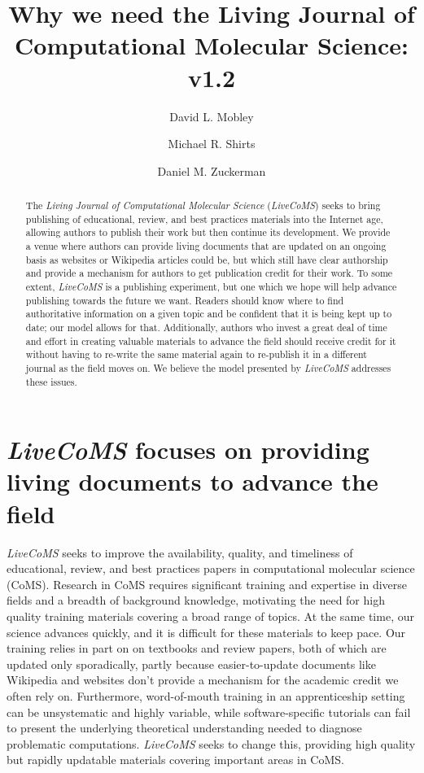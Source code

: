 \documentclass[9pt,editorial]{livecoms}
\title{Why we need the Living Journal of Computational Molecular Science: v1.2}
\author[1*]{David L. Mobley}
\author[2*]{Michael R. Shirts}
\author[3*]{Daniel M. Zuckerman}
\affil[1]{Department of Pharmaceutical Sciences and Chemistry, University of California, Irvine}
\affil[2]{Department of Chemical and Biological Engineering, University of Colorado Boulder}
\affil[3]{Department of Biomedical Engineering, Oregon Health and Science University}
\begin{document}
\begin{frontmatter}

\maketitle

\begin{abstract}
The \emph{Living Journal of Computational Molecular Science} (\emph{LiveCoMS}) seeks to bring publishing of educational, review, and best practices materials into the Internet age, allowing authors to publish their work but then continue its development.
We provide a venue where authors can provide living documents that are updated on an ongoing basis as websites or Wikipedia articles could be, but which still have clear authorship and provide a mechanism for authors to get publication credit for their work.
To some extent, \emph{LiveCoMS} is a publishing experiment, but one which we hope will help advance publishing towards the future we want.
Readers should know where to find authoritative information on a given topic and be confident that it is being kept up to date; our model allows for that. 
Additionally, authors who invest a great deal of time and effort in creating valuable materials to advance the field should receive credit for it without having to re-write the same material again to re-publish it in a different journal as the field moves on. 
We believe the model presented by \emph{LiveCoMS} addresses these issues.
\end{abstract}
\end{frontmatter}

\section{\emph{LiveCoMS} focuses on providing living documents to advance the field}

\emph{LiveCoMS} seeks to improve the availability, quality, and timeliness of educational, review, and best practices papers in computational molecular science (CoMS).
Research in CoMS requires significant training and expertise in diverse fields and a breadth of background knowledge, motivating the need for high quality training materials covering a broad range of topics.
At the same time, our science advances quickly, and it is difficult for these materials to keep pace. 
Our training relies in part on on textbooks and review papers, both of which are updated only sporadically, partly because easier-to-update documents like Wikipedia and websites don't provide a mechanism for the academic credit we often rely on.
Furthermore, word-of-mouth training in an apprenticeship setting can be unsystematic and highly variable, while software-specific tutorials can fail to present the underlying theoretical understanding needed to diagnose problematic computations.
\emph{LiveCoMS} seeks to change this, providing high quality but rapidly updatable materials covering important areas in CoMS.
\end{document}

